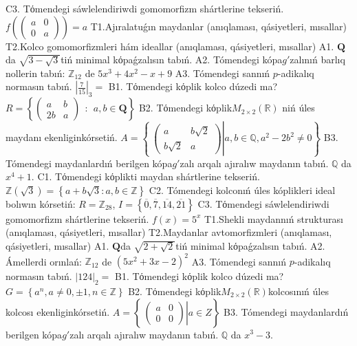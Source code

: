 C3. Tόmendegi sáwlelendiriwdi gomomorfizm shártlerine tekseriń. \(f\left( \begin{pmatrix}
a & 0 \\
0 & a
\end{pmatrix} \right) = a\)
T1.Ajıralatuǵın maydanlar (anıqlaması, qásiyetleri, mısallar)
T2.Kolco gomomorfizmleri hám ideallar (anıqlaması, qásiyetleri, mısallar)
A1. \(\mathbf{Q}\)da \(\sqrt{3 - \sqrt{3}}\)tiń minimal kόpaǵzalısın tabıń.
A2. Tómendegi kópa\(g'\)zalınıń barlıq nollerin tabıń: \(\mathbb{Z}_{12}\) de \(5x^{3} + 4x^{2} - x + 9\)
A3. Tómendegi sannıń \(p\)-adikalıq normasın tabıń. \(|\frac{7}{15}|_{3} =\)
B1. Tόmendegi kόplik kolco dúzedi ma? \(R = \left\{ \begin{pmatrix}
a & b \\
2b & a
\end{pmatrix}\ \ :\ \ a,b \in \mathbf{Q} \right\}\)
B2. Tόmendegi kόplik\(M_{2 \times 2}\left( \mathbb{R} \right)\) niń úles maydanı ekenliginkórsetiń. \(A = \left\{ \left. \ \begin{pmatrix}
a & b\sqrt{2} \\
b\sqrt{2} & a
\end{pmatrix} \right|a,b\mathbb{\in Q},a^{2} - 2b^{2} \neq 0 \right\}\)
B3. Tómendegi maydanlardıń berilgen kópa\(g'\)zalı arqalı ajıralıw maydanın tabıń. \(\mathbb{Q}\) da \(x^{4} + 1\).
C1. Tόmendegi kόplikti maydan shártlerine tekseriń. \(\mathbb{Z}\left( \sqrt{3} \right) = \left\{ a + b\sqrt{3}:a,b \in \mathbb{Z} \right\}\)
C2. Tómendegi kolconıń úles kóplikleri ideal bolıwın kórsetiń:
\(R = \mathbb{Z}_{28}\), \(I = \left\{ \overline{0},\overline{7},\overline{14},\overline{21} \right\}\)
C3. Tόmendegi sáwlelendiriwdi gomomorfizm shártlerine tekseriń. \(f(x) = 5^{x}\)
T1.Shekli maydannıń strukturası (anıqlaması, qásiyetleri, mısallar)
T2.Maydanlar avtomorfizmleri (anıqlaması, qásiyetleri, mısallar)
A1. \(\mathbf{Q}\)da \(\sqrt{2 + \sqrt{2}}\)tiń minimal kόpaǵzalısın tabıń.
A2. Ámellerdi orınlań: \(\mathbb{Z}_{12}\) de \(\left( 5x^{2} + 3x - 2 \right)^{2}\)
A3. Tómendegi sannıń \(p\)-adikalıq normasın tabıń. \(|124|_{2} =\)
B1. Tόmendegi kόplik kolco dúzedi ma? \(G = \left\{ a^{n},a \neq 0, \pm 1,n \in \mathbb{Z} \right\}\)
B2. Tόmendegi kόplik\(M_{2 \times 2}\left( \mathbb{R} \right)\)kolcosınıń úles kolcosı ekenliginkórsetiń. \(A = \left\{ \left. \ \begin{pmatrix}
a & 0 \\
0 & 0
\end{pmatrix} \right|a \in Z \right\}\)
B3. Tómendegi maydanlardıń berilgen kópa\(g'\)zalı arqalı ajıralıw maydanın tabıń. \(\mathbb{Q}\) da \(x^{3} - 3\).
